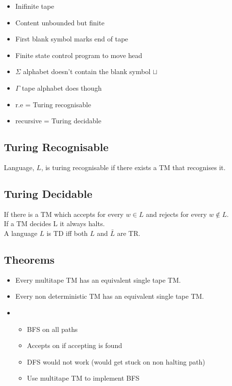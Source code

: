 \begin{itemize}
    \item Inifinite tape
    \item Content unbounded but finite
    \item First blank symbol marks end of tape
    \item Finite state control program to move head
    \item $\Sigma$ alphabet doesn't contain the blank symbol $\sqcup$
    \item $\Gamma$ tape alphabet does though
    \item r.e = Turing recognisable
    \item recursive = Turing decidable
\end{itemize}

\subsection{Turing Recognisable}
Language, $L$, is turing recognisable if there exists a TM that recognises it.

\subsection{Turing Decidable}
If there is a TM which accepts for every $w\in L$ and rejects for every $w \notin L$.\\
If a TM decides L it always halts.\\
A language $L$ is TD iff both $L$ and $\bar{L}$ are TR.

\subsection{Theorems}
\begin{itemize}
    \item Every multitape TM has an equivalent single tape TM.
    \item Every non deterministic TM has an equivalent single tape TM.
    \item \begin{itemize}
        \item BFS on all paths
        \item Accepts on if accepting is found
        \item DFS would not work (would get stuck on non halting path)
        \item Use multitape TM to implement BFS
    \end{itemize}
\end{itemize}

